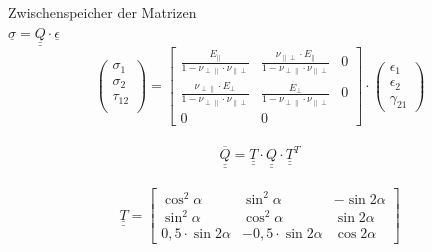 Zwischenspeicher der Matrizen\\


$ \underline{\sigma}=\underline{\underline{Q}} \cdot \underline{\epsilon} $\\

\begin{equation}
\begin{pmatrix}
	\sigma_{1}\\
	\sigma_{2}\\
	\tau_{12}\\
\end{pmatrix} 
= \begin{bmatrix}
	\frac{E_{\|}}{1-\nu_{\perp \|}\cdot \nu_{\| \perp}}&	\frac{\nu_{\| \perp}\cdot E_{\|}}{1-\nu_{\perp \|}\cdot \nu_{\| \perp}}&0\\
	
	\frac{\nu_{\perp \|}\cdot E_{\perp}}{1-\nu_{\perp \|}\cdot \nu_{\| \perp}}&\frac{E_{\perp}}{1-\nu_{\perp \|}\cdot \nu_{\| \perp}}&0\\
	
	0&0
\end{bmatrix}
\cdot 
\begin{pmatrix}
	\epsilon_{1}\\
	\epsilon_{2}\\
	\gamma_{21}
\end{pmatrix}
\end{equation}\\



\begin{equation}
	\overline{\underline{\underline{Q}}}=\underline{\underline{T}}\cdot \underline{\underline{Q}} \cdot \underline{\underline{T}}^{T}  
\end{equation}\\


\begin{equation}
	\underline{\underline{T}}=
	\begin{bmatrix}
		\cos^{2}\alpha&\sin^{2}\alpha&-\sin 2\alpha\\
		\sin^{2}\alpha&\cos^{2}\alpha&\sin 2\alpha\\
		0,5\cdot \sin2\alpha&-0,5\cdot\sin2\alpha&\cos 2\alpha
	\end{bmatrix}
\end{equation}\\


